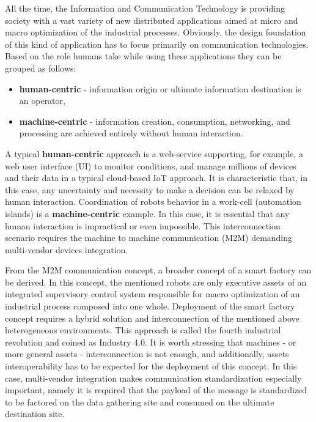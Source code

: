 \documentclass{article}
\begin{document}
All the time, the Information and Communication Technology is providing society with a vast variety of new distributed applications aimed at micro and macro optimization of the industrial processes. Obviously, the design foundation of this kind of application has to focus primarily on communication technologies. Based on the role humans take while using these applications they can be grouped as follows:

\begin{itemize}
      \item \textbf{human-centric} - information origin or ultimate information destination is an operator,
      \item \textbf{machine-centric} - information creation, consumption, networking, and processing are achieved entirely without human interaction.
\end{itemize}

A typical \textbf{human-centric} approach is a web-service supporting, for example, a web user interface (UI) to monitor conditions, and manage millions of devices and their data in a typical cloud-based IoT approach. It is characteristic that, in this case, any uncertainty and necessity to make a decision can be relaxed by human interaction. Coordination of robots behavior in a work-cell (automation islands) is a \textbf{machine-centric} example. In this case, it is essential that any human interaction is impractical or even impossible. This interconnection scenario requires the machine to machine communication (M2M) demanding multi-vendor devices integration.

From the M2M communication concept, a broader concept of a smart factory can be derived. In this concept, the mentioned robots are only executive assets of an integrated supervisory control system responsible for macro optimization of an industrial process composed into one whole. Deployment of the smart factory concept requires a hybrid solution and interconnection of the mentioned above heterogeneous environments. This approach is called the fourth industrial revolution and coined as Industry 4.0. It is worth stressing that machines - or more general assets - interconnection is not enough, and additionally, assets interoperability has to be expected for the deployment of this concept. In this case, multi-vendor integration makes communication standardization especially important, namely it is required that the payload of the message is standardized to be factored on the data  gathering site and consumed on the ultimate destination site.
\end{document}
